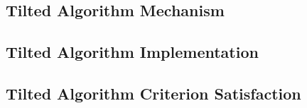 \label{sec:tilted-strategy}



\subsection{Tilted Algorithm Mechanism}
\label{sec:tilted-mechanism}











\subsection{Tilted Algorithm Implementation}
\label{sec:tilted-implementation}



\subsection{Tilted Algorithm Criterion Satisfaction}
\label{sec:tilted-satisfaction}


